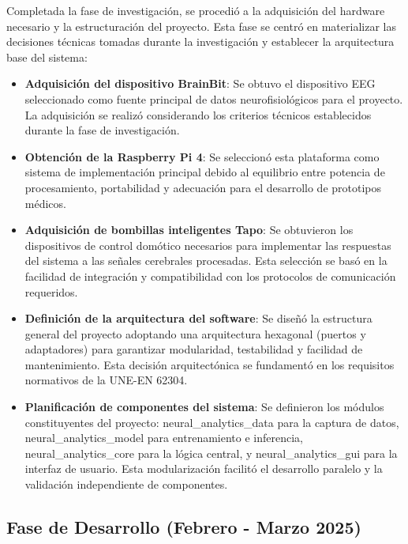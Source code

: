 Completada la fase de investigación, se procedió a la adquisición del hardware necesario y la estructuración del proyecto. Esta fase se centró en materializar las decisiones técnicas tomadas durante la investigación y establecer la arquitectura base del sistema:

\begin{itemize}
    \item \textbf{Adquisición del dispositivo BrainBit}: Se obtuvo el dispositivo EEG seleccionado como fuente principal de datos neurofisiológicos para el proyecto. La adquisición se realizó considerando los criterios técnicos establecidos durante la fase de investigación.
    
    \item \textbf{Obtención de la Raspberry Pi 4}: Se seleccionó esta plataforma como sistema de implementación principal debido al equilibrio entre potencia de procesamiento, portabilidad y adecuación para el desarrollo de prototipos médicos.
    
    \item \textbf{Adquisición de bombillas inteligentes Tapo}: Se obtuvieron los dispositivos de control domótico necesarios para implementar las respuestas del sistema a las señales cerebrales procesadas. Esta selección se basó en la facilidad de integración y compatibilidad con los protocolos de comunicación requeridos.
    
    \item \textbf{Definición de la arquitectura del software}: Se diseñó la estructura general del proyecto adoptando una arquitectura hexagonal (puertos y adaptadores) para garantizar modularidad, testabilidad y facilidad de mantenimiento. Esta decisión arquitectónica se fundamentó en los requisitos normativos de la UNE-EN 62304.
    
    \item \textbf{Planificación de componentes del sistema}: Se definieron los módulos constituyentes del proyecto: neural\_analytics\_data para la captura de datos, neural\_analytics\_model para entrenamiento e inferencia, neural\_analytics\_core para la lógica central, y neural\_analytics\_gui para la interfaz de usuario. Esta modularización facilitó el desarrollo paralelo y la validación independiente de componentes.
\end{itemize}

\subsection{Fase de Desarrollo (Febrero - Marzo 2025)}

